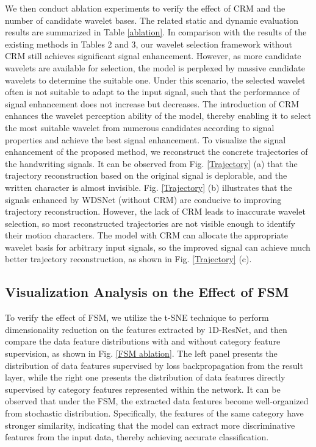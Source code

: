 \documentclass[letterpaper]{article} %
\begin{document}
	We then conduct ablation experiments to verify the effect of CRM and the number of candidate wavelet bases. The related static and dynamic evaluation results are summarized in Table \ref{ablation}.
	In comparison with the results of the existing methods in Tables 2 and 3, our wavelet selection framework without CRM still achieves significant signal enhancement. However, as more candidate wavelets are available for selection, the model is perplexed by massive candidate wavelets to determine the suitable one.
	Under this scenario, the selected wavelet often is not suitable to adapt to the input signal, such that the performance of signal enhancement does not increase but decreases.
	The introduction of CRM enhances the wavelet perception ability of the model, thereby enabling it to select the most suitable wavelet from numerous candidates according to signal properties and achieve the best signal enhancement.
	To visualize the signal enhancement of the proposed method, we reconstruct the concrete trajectories of the handwriting signals. It can be observed from Fig. \ref{Trajectory} (a) that the trajectory reconstruction based on the original signal is deplorable, and the written character is almost invisible. Fig. \ref{Trajectory} (b) illustrates that the signals enhanced by WDSNet (without CRM) are conducive to improving trajectory reconstruction. However, the lack of CRM leads to inaccurate wavelet selection, so most reconstructed trajectories are not visible enough to identify their motion characters. The model with CRM can allocate the appropriate wavelet basis for arbitrary input signals, so the improved signal can achieve much better trajectory reconstruction, as shown in Fig. \ref{Trajectory} (c).
	
	\subsection{Visualization Analysis on the Effect of FSM}

	To verify the effect of FSM, we utilize the t-SNE technique to perform dimensionality reduction on the features extracted by 1D-ResNet, and then compare the data feature distributions with and without category feature supervision, as shown in Fig. \ref{FSM ablation}. The left panel presents the distribution of data features supervised by loss backpropagation from the result layer, while the right one presents the distribution of data features directly supervised by category features represented within the network. It can be observed that under the FSM, the extracted data features become well-organized from stochastic distribution. Specifically, the features of the same category have stronger similarity, indicating that the model can extract more discriminative features from the input data, thereby achieving accurate classification.
	
\end{document}
